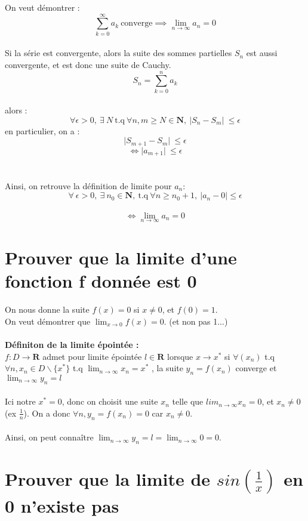 \documentclass{article}
\begin{document}
On veut démontrer :
\[ \sum_{k=0}^{\infty} a_k\ \text{converge} \implies \lim_{n\to\infty} a_n = 0 \]\\
Si la série est convergente, alors la suite des sommes partielles $ S_n $ est aussi convergente, et est donc une suite de Cauchy.
\[ S_n = \sum_{k=0}^{n} a_k \]\\
alors :
\[ \forall \epsilon > 0,\ \exists\ N\ \text{t.q}\ \forall n, m \geq N \in \mathbf{N},\ \lvert S_n - S_m \lvert\ \leq \epsilon \]
en particulier, on a :
\[ \lvert S_{m+1} - S_m \lvert\ \leq \epsilon \]
\[ \Leftrightarrow \lvert a_{m+1} \lvert\ \leq \epsilon \]\\\\
Ainsi, on retrouve la définition de limite pour $ a_n $:\\
\[ \forall\ \epsilon > 0,\ \exists\ n_0 \in \mathbf{N},\ \text{t.q}\ \forall n \geq n_0 + 1,\ |a_n - 0| \leq \epsilon \]\\
\[ \Leftrightarrow \lim_{n\to\infty} a_n = 0 \]

\newpage

\section{Prouver que la limite d'une fonction f donnée est 0}

On nous donne la suite $ f(x) = 0 $ si $ x \neq 0 $, et $ f(0) = 1 $.\\
On veut démontrer que $ \lim_{x\to{0}} f(x) = 0 $. (et non pas 1...)\\\\
\textbf{Définiton de la limite épointée :}\\
$ f : D \to \mathbf{R} $ admet pour limite épointée $ l \in \mathbf{R} $ lorsque $ x \to x^* $ si $ \forall (x_n) $ t.q $ \forall n, x_n \in D \backslash \{x^*\} $ t.q $ \lim_{n\to\infty} x_n = x^*$ , la suite $ y_n = f(x_n) $ converge et $ \lim_{n\to\infty} y_n = l$\\\\
Ici notre $ x^* = 0 $, donc on choisit une suite $ x_n $ telle que $ lim_{n\to\infty} x_n = 0$, et $ x_n \neq 0$ (ex $\frac{1}{n}$). On a donc $ \forall n, y_n = f(x_n) = 0 $ car $x_n \neq 0$.\\\\
Ainsi, on peut connaître $ \lim_{n\to\infty} y_n = l = \lim_{n\to\infty} 0 = 0$.

\newpage
\section{Prouver que la limite de $ sin(\frac{1}{x}) $ en 0 n'existe pas}
\end{document}
